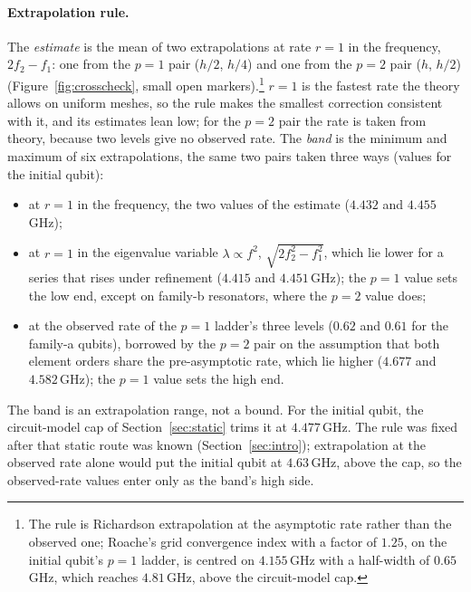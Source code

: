 \documentclass{anvil-paper}
\begin{document}
\paragraph{Extrapolation rule.}
The \emph{estimate} is the mean of two extrapolations at rate $r = 1$ in the
frequency, $2f_2 - f_1$: one from the $p = 1$ pair ($h/2$, $h/4$) and one
from the $p = 2$ pair ($h$, $h/2$) (Figure~\ref{fig:crosscheck}, small open
markers).\footnote{The rule is Richardson extrapolation
\citep{richardson1911approximate} at the asymptotic rate rather than the
observed one; Roache's grid convergence index \citep{roache1994perspective}
with a factor of $1.25$, on the initial qubit's $p = 1$ ladder, is centred
on $4.155$\,GHz with a half-width of $0.65$\,GHz, which reaches
$4.81$\,GHz, above the circuit-model cap.} $r = 1$ is the fastest rate the theory
allows on uniform meshes, so the rule makes the smallest correction
consistent with it, and its estimates lean low; for the $p = 2$ pair the
rate is taken from theory, because two levels give no observed rate. The
\emph{band} is the minimum and maximum of six extrapolations, the same two
pairs taken three ways (values for the initial qubit):
\begin{itemize}\setlength{\itemsep}{0pt}
  \item at $r = 1$ in the frequency, the two values of the estimate
    ($4.432$ and $4.455$\,GHz);
  \item at $r = 1$ in the eigenvalue variable $\lambda\propto f^2$,
    $\sqrt{2f_2^2 - f_1^2}$, which lie lower for a series that rises
    under refinement ($4.415$ and $4.451$\,GHz); the $p = 1$ value sets
    the low end, except on family-b resonators, where the $p = 2$ value
    does;
  \item at the observed rate of the $p = 1$ ladder's three levels
    ($0.62$ and $0.61$ for the family-a qubits), borrowed by the $p = 2$
    pair on the assumption that both element orders share the
    pre-asymptotic rate, which lie higher ($4.677$ and $4.582$\,GHz); the
    $p = 1$ value sets the high end.
\end{itemize}
The band is an extrapolation range, not a bound. For the initial qubit,
the circuit-model cap of Section~\ref{sec:static} trims it at
$4.477$\,GHz. The rule was fixed after that static route was known
(Section~\ref{sec:intro}); extrapolation at the observed rate alone would
put the initial qubit at $4.63$\,GHz, above the cap, so the observed-rate
values enter only as the band's high side.
\end{document}
